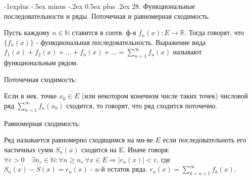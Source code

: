 \documentclass[unicode,10pt, landscape]{article}
\makeatletter
\renewcommand{\subsection}{\@startsection{subsection}{2}{0mm}%
                                {-1explus -.5ex minus -.2ex}%
                                {0.5ex plus .2ex}%
                                {\normalfont\normalsize\bfseries}}
\makeatother
\begin{document}
\begin{multicols}{4}
 \subsection{28. Функциональные последовательности и ряды. Поточечная и равномерная сходимость.}
 \begin{Def}
  Пусть каждому $n \in \mathbb{N}$ ставится в соотв. ф-я $f_n(x): E \to \mathbb{R}$. Тогда говорят, что $\{f_n(x)\}$ - функциональная последовательность.
  Выражение вида $f_1(x) + f_2(x) + \ldots + f_n(x) + \ldots = \sum_{n=1}^\infty f_n(x)$ называют функциональным рядом.
 \end{Def}
 Поточечная сходимость:
 \begin{Def}
  Если в нек. точке $x_0 \in E$ (или некотором конечном числе таких точек) числовой ряд $\sum_{n=1}^\infty f_n(x_0)$ сходится, то говорят, что ряд сходится поточечно.
 \end{Def}
 Равномерная сходимость:
 \begin{Def}
  Ряд называется равномерно сходящимся на мн-ве $E$ если последовательноть его частичных сумм $S_n(x)$ сходится на E. Иначе говоря: $\forall \varepsilon >0 \quad \exists n_{ \varepsilon  }\in \mathbb{N}: \forall n \ge n_\varepsilon \  \forall x \in E  \Rightarrow \left|r_n(x)\right| < \varepsilon$, где $ S_n(x)-S(x)=r_n(x)$ - n-й остаток ряда. $r_n(x) =\sum_{k = n + 1}^\infty f_k(x)$.
 \end{Def}

\end{multicols}
\end{document}
